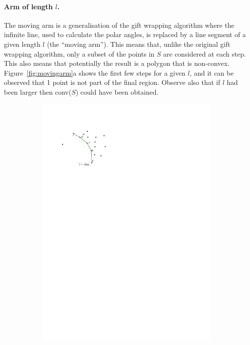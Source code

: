 \paragraph{Arm of length $l$.} 
The moving arm is a generalisation of the gift wrapping algorithm where the infinite line, used to calculate the polar angles, is replaced by a line segment of a given length $l$ (the ``moving arm'').
This means that, unlike the original gift wrapping algorithm, only a subset of the points in $S$ are considered at each step.
This also means that potentially the result is a polygon that is non-convex.
Figure~\ref{fig:movingarm}a shows the first few steps for a given $l$, and it can be observed that 1 point is not part of the final region.
Observe also that if $l$ had been larger then conv($S$) could have been obtained.
\begin{figure}
  \centering
  \begin{subfigure}[b]{0.3\linewidth}
    \centering
    \includegraphics[page=1,width=\textwidth]{figs/movingarm.pdf}

\end{subfigure}
\end{figure}
